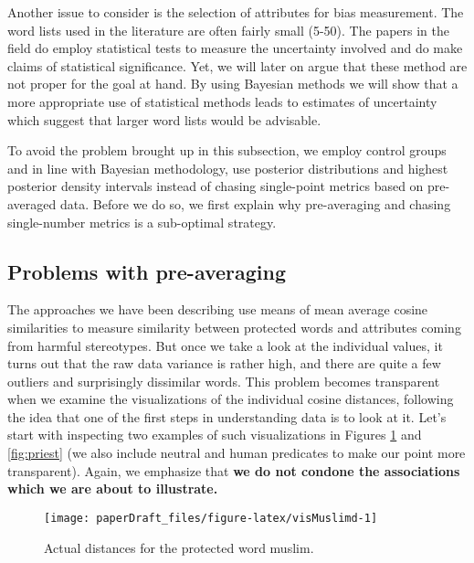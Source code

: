 \documentclass[
  12pt,
  dvipsnames,enabledeprecatedfontcommands]{scrartcl}
\begin{document}
Another issue to consider is the selection of attributes for bias
measurement. The word lists used in the literature are often fairly
small (5-50). The papers in the field do employ statistical tests to
measure the uncertainty involved and do make claims of statistical
significance. Yet, we will later on argue that these method are not
proper for the goal at hand. By using Bayesian methods we will show that
a more appropriate use of statistical methods leads to estimates of
uncertainty which suggest that larger word lists would be advisable.

To avoid the problem brought up in this subsection, we employ control
groups and in line with Bayesian methodology, use posterior
distributions and highest posterior density intervals instead of chasing
single-point metrics based on pre-averaged data. Before we do so, we
first explain why pre-averaging and chasing single-number metrics is a
sub-optimal strategy.

\hypertarget{problems-with-pre-averaging}{%
\subsection{Problems with
pre-averaging}\label{problems-with-pre-averaging}}

\label{subsec:problems}

The approaches we have been describing use means of mean average cosine
similarities to measure similarity between protected words and
attributes coming from harmful stereotypes. But once we take a look at
the individual values, it turns out that the raw data variance is rather
high, and there are quite a few outliers and surprisingly dissimilar
words. This problem becomes transparent when we examine the
visualizations of the individual cosine distances, following the idea
that one of the first steps in understanding data is to look at it.
Let's start with inspecting two examples of such visualizations in
Figures \ref{fig:muslim} and \ref{fig:priest} (we also include neutral
and human predicates to make our point more transparent). Again, we
emphasize that \textbf{we do not condone the associations which we are
about to illustrate.}

\begin{figure}[H]

\begin{center}\texttt{[image: paperDraft\_files/figure-latex/visMuslimd-1]} \end{center}
\caption{Actual distances for the protected word \textsf{muslim}. }
\label{fig:muslim}
\end{figure}
\end{document}
